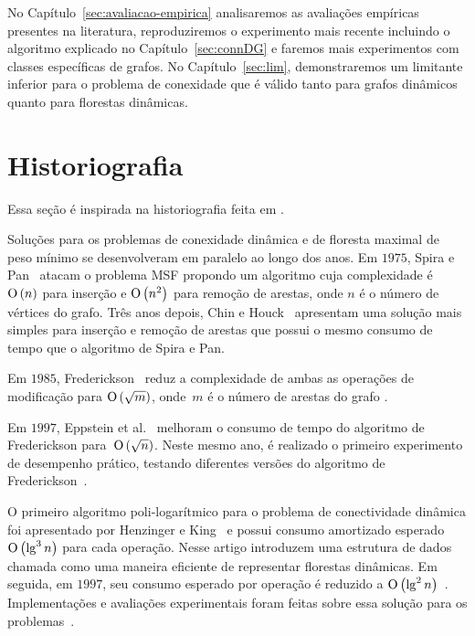 No Capítulo~\ref{sec:avaliacao-empirica} analisaremos as avaliações empíricas presentes na literatura, reproduziremos o experimento mais recente incluindo o algoritmo explicado no Capítulo~\ref{sec:connDG} e faremos mais experimentos com classes específicas de grafos. No Capítulo~\ref{sec:lim}, demonstraremos um limitante inferior para o problema de conexidade que é válido tanto para grafos dinâmicos quanto para florestas dinâmicas.

\section{Historiografia}

Essa seção é inspirada na historiografia feita em \cite{QC22, HHSRecentAdvances2022, bruceM}.

Soluções para os problemas de conexidade dinâmica e de floresta maximal de peso mínimo se desenvolveram em paralelo ao longo dos anos. Em $1975$, Spira e Pan~\cite{SP1975} atacam o problema MSF propondo um algoritmo cuja complexidade é $\text{O}\left(n\right)$ para inserção e $\text{O}\left(n^2\right)$ para remoção de arestas, onde $n$ é o número de vértices do grafo. Três anos depois, Chin e Houck~\cite{CH1978} apresentam uma solução mais simples para inserção e remoção de arestas que possui o mesmo consumo de tempo que o algoritmo de Spira e Pan.

Em $1985$, Frederickson~\cite{frederickson1983data} reduz a complexidade de ambas as operações de modificação para $\text{O}\left(\sqrt{m}\right)$, onde~$m$ é o número de arestas do grafo .

Em $1997$, Eppstein et al.~\cite{Eppstein1992SparsificationaTF} melhoram o consumo de tempo do algoritmo de Frederickson para~$\text{O}\left(\sqrt{n}\right)$. Neste mesmo ano, é realizado o primeiro experimento de desempenho prático, testando diferentes versões do algoritmo de Frederickson~\cite{xpAnalyGiuseppe}.

O primeiro algoritmo poli-logarítmico para o problema de conectividade dinâmica foi apresentado por Henzinger e King~\cite{HenzingerKing} e possui consumo amortizado esperado $\text{O}\left(\lg^3 n\right)$ para cada operação. Nesse artigo introduzem uma estrutura de dados chamada  como uma maneira eficiente de representar florestas dinâmicas. Em seguida, em $1997$, seu consumo esperado por operação é reduzido a $\text{O}\left(\lg^2 n\right)$~\cite{HenzingerThorup}.  Implementações e avaliações experimentais foram feitas sobre essa solução para os problemas~\cite{EmpiricalStudy1997, EmpiricalStudy2002, Zaroliagis2002}.

